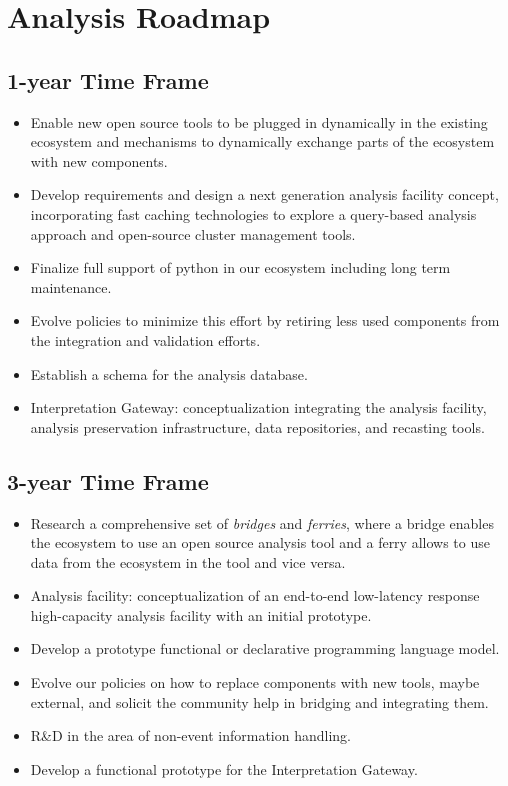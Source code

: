 \documentclass[12pt,a4paper]{article}
\begin{document}
\section{Analysis Roadmap}

\subsection{1-year Time Frame}

\begin{itemize}
\item Enable new open source tools to be plugged in dynamically in the existing ecosystem and mechanisms to dynamically exchange parts of the ecosystem with new components.
\item Develop requirements and design a next generation analysis facility concept, incorporating fast caching technologies to explore a query-based analysis approach and open-source cluster management tools.
\item Finalize full support of python in our ecosystem including long term maintenance.
\item Evolve policies to minimize this effort by retiring less used components from the integration and validation efforts.
\item Establish a schema for the analysis database.
\item Interpretation Gateway: conceptualization integrating the analysis facility, analysis preservation infrastructure, data repositories, and recasting tools. 
\end{itemize}

\subsection{3-year Time Frame}

\begin{itemize}
\item Research a comprehensive set of {\it bridges} and {\it ferries}, where a bridge enables the ecosystem to use an open source analysis tool and a ferry allows to use data from the ecosystem in the tool and vice versa.
\item Analysis facility: conceptualization of an end-to-end low-latency response high-capacity analysis facility with an initial prototype.
\item Develop a prototype functional or declarative programming language model.
\item Evolve our policies on how to replace components with new tools, maybe external, and solicit the community help in bridging and integrating them.
\item R\&D in the area of non-event information handling.
\item Develop a functional prototype for the Interpretation Gateway.
\end{itemize}
\end{document}
